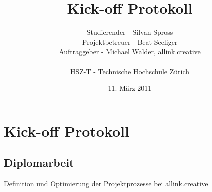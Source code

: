 \documentclass[]{scrreprt}
\title{Kick-off Protokoll}
\author{Studierender - Silvan Spross\\
    Projektbetreuer - Beat Seeliger\\
    Auftraggeber - Michael Walder, allink.creative\\
    \\
    HSZ-T - Technische Hochschule Zürich}
\date{11. März 2011}
\begin{document}
    \ifpdf
    \else
    \fi

    \maketitle



    \chapter{Kick-off Protokoll}

    \section{Diplomarbeit}
    Definition und Optimierung der Projektprozesse bei allink.creative
\end{document}
